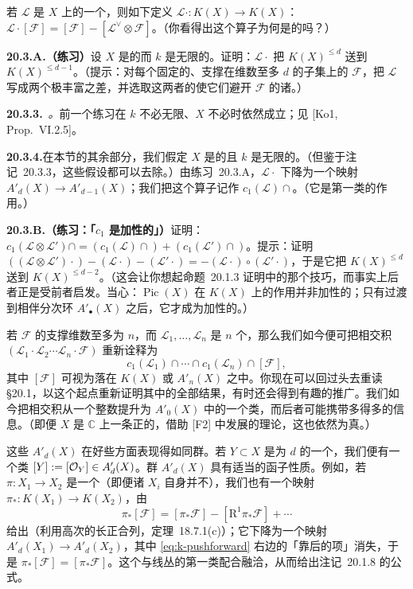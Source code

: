 若 $\mathscr{L}$ 是 $X$ 上的一个\trInvertibleSheaf，则如下定义 $\mathscr{L}\cdot\colon K(X)\to K(X)$：$\mathscr{L}\cdot[\mathscr{F}]=[\mathscr{F}]-[\mathscr{L}^{\vee}\otimes\mathscr{F}]$。（你看得出这个算子为何是\trWellDefined{}的吗？）

\textbf{20.3.A.（练习）}\quad 设 $X$ 是\trProjective{}的而 $k$ 是无限的。证明：$\mathscr{L}\cdot$ 把 $K(X)^{\le d}$ 送到 $K(X)^{\le d-1}$。（提示：对每个固定的、支撑在维数至多 $d$ 的子集上的 $\mathscr{F}$，把 $\mathscr{L}$ 写成两个极丰富\trInvertibleSheaf{}之差，并选取这两者的\trSection{}使它们避开 $\mathscr{F}$ 的诸\trAssociatedPoint。）

\textbf{20.3.3.}\ \emph{\trhRemark{}。}\quad 前一个练习在 $k$ 不必无限、$X$ 不必\trProper{}时依然成立；见 [Ko1, Prop.~VI.2.5]。

\textbf{20.3.4.}\quad 在本节的其余部分，我们假定 $X$ 是\trProjective{}的且 $k$ 是无限的。（但鉴于\mbox{注记~20.3.3}，这些假设都可以去除。）由\mbox{练习~20.3.A}，$\mathscr{L}\cdot$ 下降为一个映射 $A'_d(X)\to A'_{d-1}(X)$；我们把这个算子记作 $c_1(\mathscr{L})\cap$。（它是第一\trChern{}类的作用。）

\textbf{20.3.B.（练习：「$c_1$ 是加性的」）}\quad 证明：$c_1(\mathscr{L}\otimes\mathscr{L}')\cap=(c_1(\mathscr{L})\cap)+(c_1(\mathscr{L}')\cap)$。提示：证明 $((\mathscr{L}\otimes\mathscr{L}')\cdot)-(\mathscr{L}\cdot)-(\mathscr{L}'\cdot)=-(\mathscr{L}\cdot)\circ(\mathscr{L}'\cdot)$，于是它把 $K(X)^{\le d}$ 送到 $K(X)^{\le d-2}$。（这会让你想起\mbox{命题~20.1.3} 证明中的那个技巧，而事实上后者正是受前者启发。当心：$\operatorname{Pic}(X)$ 在 $K(X)$ 上的作用并非加性的；只有过渡到相伴分次环 $A'_{\bullet}(X)$ 之后，它才成为加性的。）

若 $\mathscr{F}$ 的支撑维数至多为 $n$，而 $\mathscr{L}_1,\dots,\mathscr{L}_n$ 是 $n$ 个\trInvertibleSheaf，那么我们如今便可把相交积 $(\mathscr{L}_1\cdot\mathscr{L}_2\cdots\mathscr{L}_n\cdot\mathscr{F})$ 重新诠释为
\[
c_1(\mathscr{L}_1)\cap\cdots\cap c_1(\mathscr{L}_n)\cap[\mathscr{F}],
\]
其中 $[\mathscr{F}]$ 可视为落在 $K(X)$ 或 $A'_n(X)$ 之中。你现在可以回过头去重读 \S20.1，以这个起点重新证明其中的全部结果，有时还会得到有趣的推广。我们如今把相交积从一个整数提升为 $A'_0(X)$ 中的一个类，而后者可能携带多得多的信息。（即便 $X$ 是 $\mathbb{C}$ 上一条正\trGenus{}的\trCurve，借助 [F2] 中发展的理论，这也依然为真。）

这些 $A'_d(X)$ 在好些方面表现得如同\trHomology{}群。若 $Y\subset X$ 是\trPureDimension{}为 $d$ 的一个\trClosed\trSubvariety，我们便有一个类 $[Y]:=[\mathcal{O}_Y]\in A'_d(X)$。群 $A'_d(X)$ 具有适当的函子性质。例如，若 $\pi\colon X_1\to X_2$ 是一个\trProper\trMorphism（即便诸 $X_i$ 自身并不\trProper），我们也有一个映射 $\pi_*\colon K(X_1)\to K(X_2)$，由
\begin{equation*}\tag{20.3.4.1}\label{eq:k-pushforward}
\pi_*[\mathscr{F}]=[\pi_*\mathscr{F}]-[\mathrm{R}^1\pi_*\mathscr{F}]+\cdots
\end{equation*}
给出（利用高次\trPushforward{}的长正合列，\mbox{定理~18.7.1(c)}）；它下降为一个映射 $A'_d(X_1)\to A'_d(X_2)$，其中 \eqref{eq:k-pushforward} 右边的「靠后的项」消失，于是 $\pi_*[\mathscr{F}]=[\pi_*\mathscr{F}]$。这个\trPushforward{}与线丛的第一\trChern{}类配合融洽，从而给出\mbox{注记~20.1.8} 的\trProjection{}公式。

